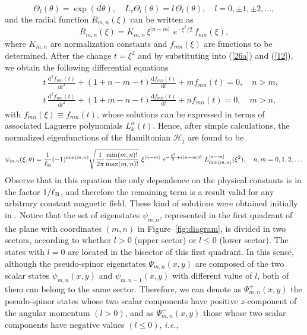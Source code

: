 \documentclass[aps,showpacs,showkeys]{revtex4}
\begin{document}
\begin{equation}\label{28}
\Theta_l(\theta)=\exp(il\theta), \quad L_z\Theta_l(\theta)=l\, \Theta_l(\theta), \quad l=0,\pm1,\pm2,\dots,
\end{equation}
and the radial function
$R_{m,n}(\xi)$ can be written as
\begin{equation}\label{29}
R_{m,n}(\xi)=K_{m,n}\,\xi^{\vert n-m\vert}\,  \ e^{-\xi^2/2}\, f_{mn}(\xi),
\end{equation}
where $K_{m,n}$ are normalization constants and $f_{mn}(\xi)$ are functions to be determined. After the change $t=\xi^2$ and by substituting into (\ref{26a}) and (\ref{12}), we obtain the following differential equations
	\begin{eqnarray}
	&&t\, \frac{\mathrm{d}^2f_{mn}(t)}{\mathrm{d}t^2}+(1+n-m-t)\frac{\mathrm{d}f_{mn}(t)}{\mathrm{d}t}+mf_{mn}(t)=0, \quad n>m, \label{30a} \\
	&&t\, \frac{\mathrm{d}^2f_{mn}(t)}{\mathrm{d}t^2}+(1+m-n-t)\frac{\mathrm{d}f_{mn}(t)}{\mathrm{d}t}+nf_{mn}(t)=0, \quad m>n, \label{30b}
	\end{eqnarray}
with $f_{mn}(\xi)\equiv f_{mn}(t)$, whose solutions can be expressed in terms of associated Laguerre polynomials $L_k^{\alpha}(t)$.
Hence, after simple calculations, the normalized eigenfunctions of the Hamiltonian $\mathcal{H}_j$ are found to be
\begin{equation}\label{31}
   \psi_{m,n}(\xi,\theta)= \frac1{\ell_{\rm B}} (-1)^{\min(m,n)} \sqrt{\frac{1}{2\pi}\frac{\min(m,n)!}{\max(m,n)!}}
   \ \xi^{\vert n-m\vert}\  e^{-\frac{\xi^2}{2}+i(n-m)\theta}\
L_{\min(m,n)}^{\vert n-m\vert} (\xi^2 ), \quad n,m=0,1,2,\dots
\end{equation}
Observe that in this equation the only dependence on the physical constants is in the factor $1/\ell_{\rm B}$, and therefore the remaining term is a result valid  for any arbitrary constant magnetic field. 
These kind of solutions were obtained initially in \cite{f28}.
Notice that the set of eigenstates $\psi_{m,n}$, represented in the first quadrant of the plane with coordinates $(m,n)$ in Figure~\ref{fig:diagram}, is divided in two sectors, according to whether $l> 0$ (upper sector) or $l\leq0$ (lower sector). The states with $l=0$ are located in the bisector of this first quadrant. In this sense, although the pseudo-spinor eigenstates $\Psi_{m,n}(x,y)$ are composed of the two scalar states $\psi_{m,n}(x,y)$ and $\psi_{m,n-1}(x,y)$ with different value of $l$, both of them can belong to the same sector. Therefore, we can denote as $\Psi_{m,n}^{+}(x,y)$ the pseudo-spinor states whose two scalar components have positive $z$-component of the angular momentum $(l>0)$, and as $\Psi_{m,n}^{-}(x,y)$ those whose two scalar components have negative values $(l\leq0)$, {\it i.e.},
\end{document}
